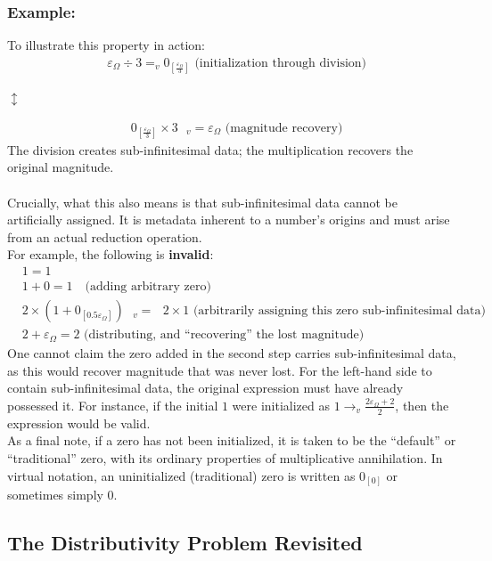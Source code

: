 \documentclass{article}
\begin{document}
\subsubsection*{Example:}
To illustrate this property in action:
\begin{align*}
&\varepsilon_\Omega \div 3 =_v 0_{[\frac{\varepsilon_\Omega}{3}]} \text{ (initialization through division)}
\end{align*}
\begin{center}
$\updownarrow$
\end{center}
\begin{align*}
&0_{[\frac{\varepsilon_\Omega}{3}]} \times 3\text{ } _v{=} \varepsilon_\Omega \text{ (magnitude recovery)} 
\end{align*} The division creates sub-infinitesimal data; the multiplication recovers the original magnitude.
\\\\Crucially, what this also means is that sub-infinitesimal data cannot be artificially assigned. It is metadata inherent to a number's origins and must arise from an actual reduction operation. 
\\For example, the following is \textbf{invalid}:
\begin{align*}
&1 = 1 \\
&1 + 0 = 1 \quad \text{(adding arbitrary zero)} \\
&2\times(1 + 0_{[0.5\varepsilon_\Omega]}) \text{ } _v{=} \text{ }2 \times 1 \text{ (arbitrarily assigning this zero sub-infinitesimal data)} \\
&2 + \varepsilon_\Omega = 2 \text{ (distributing, and ``recovering'' the lost magnitude)}
\end{align*} One cannot claim the zero added in the second step carries sub-infinitesimal data, as this would recover magnitude that was never lost. For the left-hand side to contain sub-infinitesimal data, the original expression must have already possessed it. For instance, if the initial $1$ were initialized as $1 \to_v \frac{2\varepsilon_\Omega + 2}{2}$, then the expression would be valid. \\As a final note, if a zero has not been initialized, it is taken to be the ``default'' or ``traditional'' zero, with its ordinary properties of multiplicative annihilation. In virtual notation, an uninitialized (traditional) zero is written as $0_{[0]}$ or sometimes simply $0$. 

\subsection{The Distributivity Problem Revisited}
\end{document}
